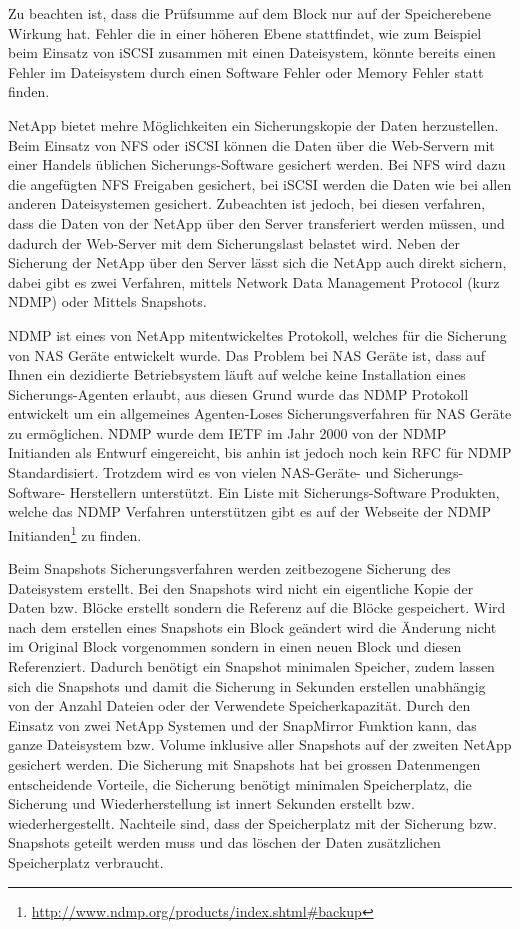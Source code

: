 Zu beachten ist, dass die Prüfsumme auf dem Block nur auf der Speicherebene Wirkung hat. Fehler die in einer höheren Ebene stattfindet, wie zum Beispiel beim Einsatz von iSCSI zusammen mit einen Dateisystem, könnte bereits einen Fehler im Dateisystem durch einen Software Fehler oder Memory Fehler statt finden. 

NetApp bietet mehre Möglichkeiten ein Sicherungskopie der Daten herzustellen. Beim Einsatz von NFS oder iSCSI können die Daten über die Web-Servern mit einer Handels üblichen Sicherungs-Software gesichert werden. Bei NFS wird dazu die angefügten NFS Freigaben gesichert, bei iSCSI werden die Daten wie bei allen anderen Dateisystemen gesichert. Zubeachten ist jedoch, bei diesen verfahren, dass die Daten von der NetApp über den Server transferiert werden müssen, und dadurch der Web-Server mit dem Sicherungslast belastet wird. Neben der Sicherung der NetApp über den Server lässt sich die NetApp auch direkt sichern, dabei gibt es zwei Verfahren, mittels Network Data Management Protocol (kurz NDMP) oder Mittels Snapshots. 

NDMP ist eines von NetApp mitentwickeltes Protokoll, welches für die Sicherung von NAS Geräte entwickelt wurde. Das Problem bei NAS Geräte ist, dass auf Ihnen ein dezidierte Betriebsystem läuft auf welche keine Installation eines Sicherungs-Agenten erlaubt, aus diesen Grund wurde das NDMP Protokoll entwickelt um ein allgemeines Agenten-Loses Sicherungsverfahren für NAS Geräte zu ermöglichen. NDMP wurde dem IETF im Jahr 2000 von der NDMP Initianden als Entwurf eingereicht, bis anhin ist jedoch noch kein RFC für NDMP Standardisiert. Trotzdem wird es von vielen NAS-Geräte- und Sicherungs-Software- Herstellern unterstützt. Ein Liste mit Sicherungs-Software Produkten, welche das NDMP Verfahren unterstützen gibt es auf der Webseite der NDMP Initianden\footnote{\url{http://www.ndmp.org/products/index.shtml#backup}} zu finden. \cite{NDMP.orga}\cite{NDMP.org}

Beim Snapshots Sicherungsverfahren werden zeitbezogene Sicherung des Dateisystem erstellt. Bei den Snapshots wird nicht ein eigentliche Kopie der Daten bzw. Blöcke erstellt sondern die Referenz auf die Blöcke gespeichert. Wird nach dem erstellen eines Snapshots ein Block geändert wird die Änderung nicht im Original Block vorgenommen sondern in einen neuen Block und diesen Referenziert. Dadurch benötigt ein Snapshot minimalen Speicher, zudem lassen sich die Snapshots und damit die Sicherung in Sekunden erstellen unabhängig von der Anzahl Dateien oder der Verwendete Speicherkapazität. Durch den Einsatz von zwei NetApp Systemen und der SnapMirror Funktion kann, das ganze Dateisystem bzw. Volume inklusive aller Snapshots auf der zweiten NetApp gesichert werden. Die Sicherung mit Snapshots hat bei grossen Datenmengen entscheidende Vorteile, die Sicherung benötigt minimalen Speicherplatz, die Sicherung und Wiederherstellung ist innert Sekunden erstellt bzw. wiederhergestellt. Nachteile sind, dass der Speicherplatz mit der Sicherung bzw. Snapshots geteilt werden muss und das löschen der Daten zusätzlichen Speicherplatz verbraucht.

